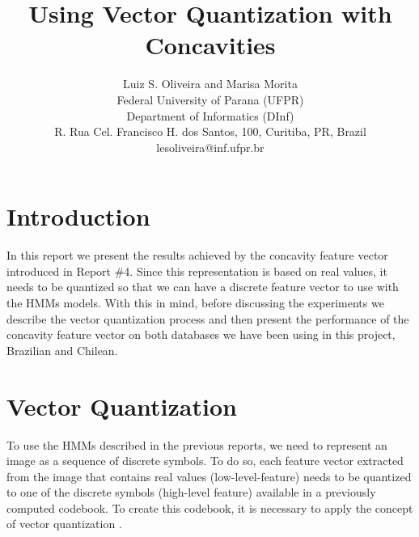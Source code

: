 \documentclass{article}[14pt, oneside, a4paper, times]
\begin{document}
\title{Using Vector Quantization with Concavities}
\author{Luiz S. Oliveira and Marisa Morita  
\\
\vspace {-10pt}
Federal University of Parana (UFPR)\\
\vspace {-10pt}
Department of Informatics (DInf)\\
\vspace {-10pt}
R. Rua Cel. Francisco H. dos Santos, 100, Curitiba, PR, Brazil \\
lesoliveira@inf.ufpr.br \\ 
}


\date{}
\maketitle
\thispagestyle{empty}





\section{Introduction} 

In this report we present the results achieved by the concavity feature vector introduced in Report \#4. Since this representation is based on real values, it needs to be quantized so that we can have a discrete feature vector to use with the HMMs models. With this in mind, before discussing the experiments we describe the vector quantization process and then present the performance of the concavity feature vector on both databases we have been using in this project, Brazilian and Chilean. 




\section{Vector Quantization}


To use the HMMs described in the previous reports, we need to represent an image as a sequence of discrete symbols. To do so, each feature vector extracted from the image that contains real values (low-level-feature) needs to be quantized to one of the discrete symbols (high-level feature) available in a previously computed codebook. To create this codebook, it is necessary to apply the concept of vector quantization \cite{Huang90}.
\end{document}
